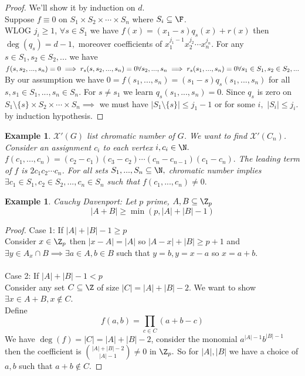 \documentclass[a4paper]{article}
\newtheorem{eg}[thm]{Example}
\begin{document}
\begin{proof}
    We'll show it by induction on $d$.\\
    Suppose $f\equiv 0$ on $S_1\times S_2\times\cdots\times S_n$ where $S_i\subseteq \F$.\\
    WLOG $j_i\geq 1$, $\forall s\in S_1$ we have $f(x)=(x_1-s)q_s(x)+r(x)$ then $\deg(q_s)=d-1,$ moreover coefficients of $x_1^{j_1-1}x_2^{j_2}\cdots x_n^{j_n}.$ For any $s\in S_1,s_2\in S_2,...$ we have $f(s,s_2,...,s_n)=0\implies r_s(s,s_2,...,s_n)=0 \space \forall s_2,...,s_n\implies r_s(s_1,...,s_n)=0 \space \space \forall s_1\in S_1,s_2\in S_2,...$  \\
    By our assumption we have $0=f(s_1,...,s_n)=(s_1-s)q_s(s_1,...,s_n)$ for all $s,s_1\in S_1,...,s_n\in S_n$. For $s\neq s_1$ we learn $q_s(s_1,...,s_n)=0.$ Since $q_s$ is zero on $S_1\setminus \{s\} \times S_2\times \cdots \times S_n\implies$ we must have $|S_1\setminus \{s\}|\leq j_1-1$ or for some $i,$ $|S_i|\leq j_i.$ by induction hypothesis.
\end{proof}
\begin{eg}
    $\mathcal{X}'(G)$ list chromatic number of $G$. We want to find $\mathcal{X}'(C_{n})$.\\
    Consider an assignment $c_i$ to each vertex $i, c_i\in \N.$ $f(c_1,...,c_n)=(c_2-c_1)(c_3-c_2)\cdots(c_n-c_{n-1})(c_1-c_n).$ The leading term of $f$ is $2c_1c_2\cdots c_n$. For all sets $S_1,...,S_n\subseteq \N,$ chromatic number implies $\exists c_1\in S_1, c_2\in S_2,...,c_n\in S_n$ such that $f(c_1,...,c_n)\neq0.$ 
\end{eg}
\begin{eg}
    Cauchy Davenport: Let $p$ prime, $A,B\subseteq \Z_p$ $$|A+B|\geq \min(p,|A|+|B|-1)$$
\end{eg}
\begin{proof}
    Case 1: If $|A|+|B|-1\geq p$\\
    Consider $x\in \Z_p$ then $|x-A|=|A|$ so $|A-x|+|B|\geq p+1$ and $\exists y\in A_x\cap B\implies \exists a\in A, b\in B$ such that $y=b,y=x-a$ so $x=a+b.$\\\\
    Case 2: If $|A|+|B|-1<p$\\
    Consider any set $C\subseteq \Z$ of size $|C|=|A|+|B|-2$. We want to show $\exists x\in A+B, x\notin C.$ \\
    Define $$f(a,b)=\prod_{c\in C}(a+b-c)$$ We have $\deg(f)=|C|=|A|+|B|-2$, consider the monomial $a^{|A|-1}b^{|B|-1}$ then the coefficient is ${|A|+|B|-2 \choose |A|-1}\neq 0$ in $\Z_p.$ So for $|A|, |B|$ we have a choice of $a,b$ such that $a+b\notin C.$ 
\end{proof}
\end{document}
